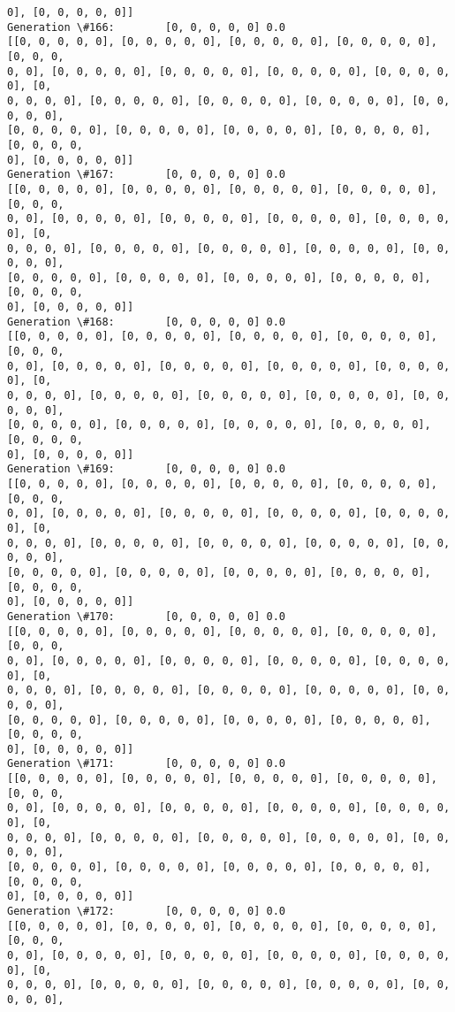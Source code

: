 \documentclass[11pt]{article}
\begin{document}
\begin{Verbatim}[commandchars=\\\{\}]
0], [0, 0, 0, 0, 0]]
Generation \#166:        [0, 0, 0, 0, 0] 0.0
[[0, 0, 0, 0, 0], [0, 0, 0, 0, 0], [0, 0, 0, 0, 0], [0, 0, 0, 0, 0], [0, 0, 0,
0, 0], [0, 0, 0, 0, 0], [0, 0, 0, 0, 0], [0, 0, 0, 0, 0], [0, 0, 0, 0, 0], [0,
0, 0, 0, 0], [0, 0, 0, 0, 0], [0, 0, 0, 0, 0], [0, 0, 0, 0, 0], [0, 0, 0, 0, 0],
[0, 0, 0, 0, 0], [0, 0, 0, 0, 0], [0, 0, 0, 0, 0], [0, 0, 0, 0, 0], [0, 0, 0, 0,
0], [0, 0, 0, 0, 0]]
Generation \#167:        [0, 0, 0, 0, 0] 0.0
[[0, 0, 0, 0, 0], [0, 0, 0, 0, 0], [0, 0, 0, 0, 0], [0, 0, 0, 0, 0], [0, 0, 0,
0, 0], [0, 0, 0, 0, 0], [0, 0, 0, 0, 0], [0, 0, 0, 0, 0], [0, 0, 0, 0, 0], [0,
0, 0, 0, 0], [0, 0, 0, 0, 0], [0, 0, 0, 0, 0], [0, 0, 0, 0, 0], [0, 0, 0, 0, 0],
[0, 0, 0, 0, 0], [0, 0, 0, 0, 0], [0, 0, 0, 0, 0], [0, 0, 0, 0, 0], [0, 0, 0, 0,
0], [0, 0, 0, 0, 0]]
Generation \#168:        [0, 0, 0, 0, 0] 0.0
[[0, 0, 0, 0, 0], [0, 0, 0, 0, 0], [0, 0, 0, 0, 0], [0, 0, 0, 0, 0], [0, 0, 0,
0, 0], [0, 0, 0, 0, 0], [0, 0, 0, 0, 0], [0, 0, 0, 0, 0], [0, 0, 0, 0, 0], [0,
0, 0, 0, 0], [0, 0, 0, 0, 0], [0, 0, 0, 0, 0], [0, 0, 0, 0, 0], [0, 0, 0, 0, 0],
[0, 0, 0, 0, 0], [0, 0, 0, 0, 0], [0, 0, 0, 0, 0], [0, 0, 0, 0, 0], [0, 0, 0, 0,
0], [0, 0, 0, 0, 0]]
Generation \#169:        [0, 0, 0, 0, 0] 0.0
[[0, 0, 0, 0, 0], [0, 0, 0, 0, 0], [0, 0, 0, 0, 0], [0, 0, 0, 0, 0], [0, 0, 0,
0, 0], [0, 0, 0, 0, 0], [0, 0, 0, 0, 0], [0, 0, 0, 0, 0], [0, 0, 0, 0, 0], [0,
0, 0, 0, 0], [0, 0, 0, 0, 0], [0, 0, 0, 0, 0], [0, 0, 0, 0, 0], [0, 0, 0, 0, 0],
[0, 0, 0, 0, 0], [0, 0, 0, 0, 0], [0, 0, 0, 0, 0], [0, 0, 0, 0, 0], [0, 0, 0, 0,
0], [0, 0, 0, 0, 0]]
Generation \#170:        [0, 0, 0, 0, 0] 0.0
[[0, 0, 0, 0, 0], [0, 0, 0, 0, 0], [0, 0, 0, 0, 0], [0, 0, 0, 0, 0], [0, 0, 0,
0, 0], [0, 0, 0, 0, 0], [0, 0, 0, 0, 0], [0, 0, 0, 0, 0], [0, 0, 0, 0, 0], [0,
0, 0, 0, 0], [0, 0, 0, 0, 0], [0, 0, 0, 0, 0], [0, 0, 0, 0, 0], [0, 0, 0, 0, 0],
[0, 0, 0, 0, 0], [0, 0, 0, 0, 0], [0, 0, 0, 0, 0], [0, 0, 0, 0, 0], [0, 0, 0, 0,
0], [0, 0, 0, 0, 0]]
Generation \#171:        [0, 0, 0, 0, 0] 0.0
[[0, 0, 0, 0, 0], [0, 0, 0, 0, 0], [0, 0, 0, 0, 0], [0, 0, 0, 0, 0], [0, 0, 0,
0, 0], [0, 0, 0, 0, 0], [0, 0, 0, 0, 0], [0, 0, 0, 0, 0], [0, 0, 0, 0, 0], [0,
0, 0, 0, 0], [0, 0, 0, 0, 0], [0, 0, 0, 0, 0], [0, 0, 0, 0, 0], [0, 0, 0, 0, 0],
[0, 0, 0, 0, 0], [0, 0, 0, 0, 0], [0, 0, 0, 0, 0], [0, 0, 0, 0, 0], [0, 0, 0, 0,
0], [0, 0, 0, 0, 0]]
Generation \#172:        [0, 0, 0, 0, 0] 0.0
[[0, 0, 0, 0, 0], [0, 0, 0, 0, 0], [0, 0, 0, 0, 0], [0, 0, 0, 0, 0], [0, 0, 0,
0, 0], [0, 0, 0, 0, 0], [0, 0, 0, 0, 0], [0, 0, 0, 0, 0], [0, 0, 0, 0, 0], [0,
0, 0, 0, 0], [0, 0, 0, 0, 0], [0, 0, 0, 0, 0], [0, 0, 0, 0, 0], [0, 0, 0, 0, 0],

\end{Verbatim}
\end{document}
